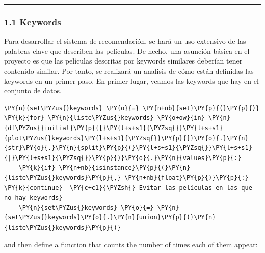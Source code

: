     \begin{center}\rule{0.5\linewidth}{\linethickness}\end{center}

\subsubsection{1.1 Keywords}\label{keywords}

    Para desarrollar el sistema de recomendación, se hará un uso extensivo
de las palabras clave que describen las películas. De hecho, una
asunción básica en el proyecto es que las películas descritas por
keywords similares deberían tener contenido similar. Por tanto, se
realizará un analisis de cómo están definidas las keywords en un primer
paso. En primer lugar, veamos las keywords que hay en el conjunto de
datos.

    \begin{tcolorbox}[breakable, size=fbox, boxrule=1pt, pad at break*=1mm,colback=cellbackground, colframe=cellborder]
\begin{Verbatim}[commandchars=\\\{\}]
\PY{n}{set\PYZus{}keywords} \PY{o}{=} \PY{n+nb}{set}\PY{p}{(}\PY{p}{)}
\PY{k}{for} \PY{n}{liste\PYZus{}keywords} \PY{o+ow}{in} \PY{n}{df\PYZus{}initial}\PY{p}{[}\PY{l+s+s1}{\PYZsq{}}\PY{l+s+s1}{plot\PYZus{}keywords}\PY{l+s+s1}{\PYZsq{}}\PY{p}{]}\PY{o}{.}\PY{n}{str}\PY{o}{.}\PY{n}{split}\PY{p}{(}\PY{l+s+s1}{\PYZsq{}}\PY{l+s+s1}{|}\PY{l+s+s1}{\PYZsq{}}\PY{p}{)}\PY{o}{.}\PY{n}{values}\PY{p}{:}
    \PY{k}{if} \PY{n+nb}{isinstance}\PY{p}{(}\PY{n}{liste\PYZus{}keywords}\PY{p}{,} \PY{n+nb}{float}\PY{p}{)}\PY{p}{:} \PY{k}{continue}  \PY{c+c1}{\PYZsh{} Evitar las películas en las que no hay keywords}
    \PY{n}{set\PYZus{}keywords} \PY{o}{=} \PY{n}{set\PYZus{}keywords}\PY{o}{.}\PY{n}{union}\PY{p}{(}\PY{n}{liste\PYZus{}keywords}\PY{p}{)}
\end{Verbatim}
\end{tcolorbox}

    and then define a function that counts the number of times each of them
appear:

